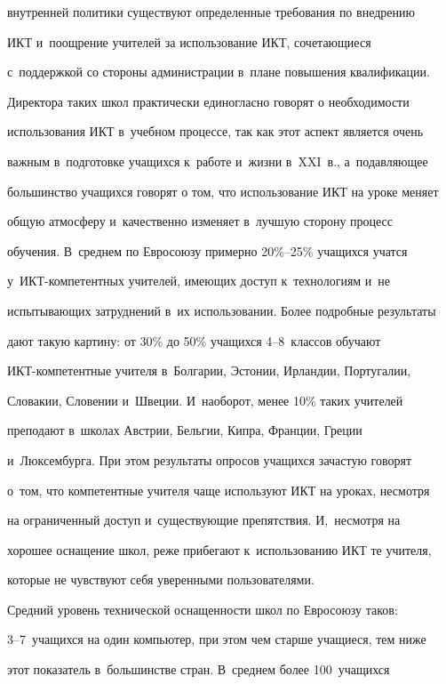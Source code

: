 внутренней политики существуют определенные требования по внедрению 


ИКТ и~поощрение учителей за использование ИКТ, сочетающиеся 


с~поддержкой со стороны администрации в~плане повышения квалификации. 


Директора таких школ практически единогласно говорят о необходимости 


использования ИКТ в~учебном процессе, так как этот аспект является очень 


важным в~подготовке учащихся к~работе и~жизни в~XXI~в., а~подавляющее 


большинство учащихся говорят о том, что использование ИКТ на уроке меняет 


общую атмосферу и~качественно изменяет в~лучшую сторону процесс 


обучения. В~среднем по Евросоюзу примерно 20\%--25\% учащихся учатся 


у~ИКТ-ком\-пе\-тент\-ных учителей, имеющих доступ к~технологиям и~не 


испытывающих затруднений в~их использовании. Более подробные результаты 


дают такую картину: от 30\% до 50\% учащихся 4--8~классов обучают  


ИКТ-ком\-пе\-тент\-ные учителя в~Болгарии, Эстонии, Ирландии, Португалии, 


Словакии, Словении и~Швеции. И~наоборот, менее 10\% таких учителей 


преподают в~школах Австрии, Бельгии, Кипра, Франции, Греции 


и~Люксембурга. При этом результаты опросов учащихся зачастую говорят 


о~том, что компетентные учителя чаще используют ИКТ на уроках, несмотря 


на ограниченный доступ и~существующие препятствия. И,~несмотря на 


хорошее оснащение школ, реже прибегают к~использованию ИКТ те учителя, 


которые не чувствуют себя уверенными пользователями.


  


  Средний уровень технической оснащенности школ по Евросоюзу таков:\linebreak  


3--7~учащихся на один компьютер, при этом чем старше учащиеся, тем ниже 


этот показатель в~большинстве стран. В~среднем более 100~учащихся 


